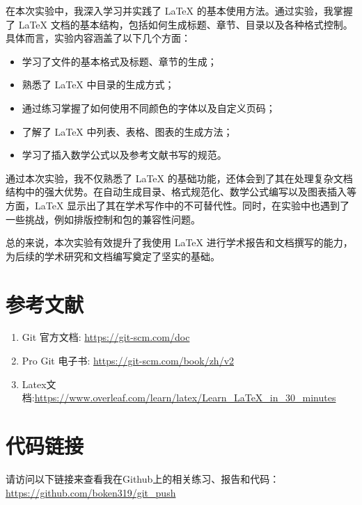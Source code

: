 \documentclass[a4paper, 12pt]{article}
\begin{document}
在本次实验中，我深入学习并实践了 LaTeX 的基本使用方法。通过实验，我掌握了 LaTeX 文档的基本结构，包括如何生成标题、章节、目录以及各种格式控制。具体而言，实验内容涵盖了以下几个方面：

\begin{itemize}
    \item 学习了文件的基本格式及标题、章节的生成；
    \item 熟悉了 LaTeX 中目录的生成方式；
    \item 通过练习掌握了如何使用不同颜色的字体以及自定义页码；
    \item 了解了 LaTeX 中列表、表格、图表的生成方法；
    \item 学习了插入数学公式以及参考文献书写的规范。
\end{itemize}

通过本次实验，我不仅熟悉了 LaTeX 的基础功能，还体会到了其在处理复杂文档结构中的强大优势。在自动生成目录、格式规范化、数学公式编写以及图表插入等方面，LaTeX 显示出了其在学术写作中的不可替代性。同时，在实验中也遇到了一些挑战，例如排版控制和包的兼容性问题。

总的来说，本次实验有效提升了我使用 LaTeX 进行学术报告和文档撰写的能力，为后续的学术研究和文档编写奠定了坚实的基础。


  \section{参考文献}
  \begin{enumerate}
      \item Git 官方文档: \url{https://git-scm.com/doc}
      \item Pro Git 电子书: \url{https://git-scm.com/book/zh/v2}
      \item Latex文档:\url{https://www.overleaf.com/learn/latex/Learn_LaTeX_in_30_minutes}
  \end{enumerate}
  
 \section{代码链接}
      请访问以下链接来查看我在Github上的相关练习、报告和代码：
\url{https://github.com/boken319/git_push}
\end{document}
